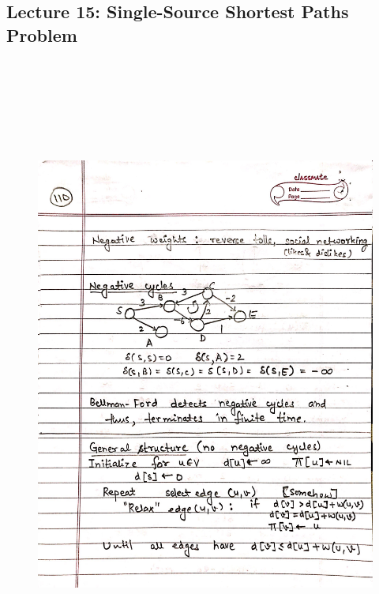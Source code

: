 \newpage
{\color{black} \subsection*{Lecture 15: Single-Source Shortest Paths Problem}}
\begin{figure}[H]
    \centering
    \includegraphics[width=16cm, height=21cm]{"./MIT-6.006/MIT-6006-110"}
\end{figure}

